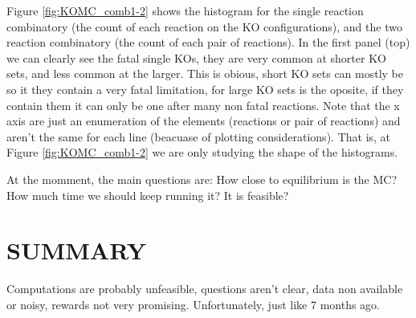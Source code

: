 \documentclass[
10pt, %
a4paper, %
oneside, %
headinclude,footinclude, %
BCOR5mm, %
]{scrartcl}
\begin{document}
Figure \ref{fig:KOMC_comb1-2} shows the histogram for the single reaction combinatory (the count of each reaction on the KO configurations), 
and the two reaction combinatory (the count of each pair of reactions).
In the first panel (top) we can clearly see the fatal single KOs, they are very common at shorter KO sets, and less common at the larger. 
This is obious, short KO sets can mostly be so it they contain a very fatal limitation, for large KO sets is the oposite, if they contain them it can only be one after many non fatal reactions.
Note that the x axis are just an enumeration of the elements (reactions or pair of reactions) and aren't the same for each line (beacuase of plotting considerations).
That is, at Figure \ref{fig:KOMC_comb1-2} we are only studying the shape of the histograms.

At the momment, the main questions are: How close to equilibrium is the MC? How much time we should keep running it? It is feasible?


\section{SUMMARY}

Computations are probably unfeasible, questions aren't clear, data non available or noisy, rewards not very promising.
Unfortunately, just like 7 months ago.












\end{document}
